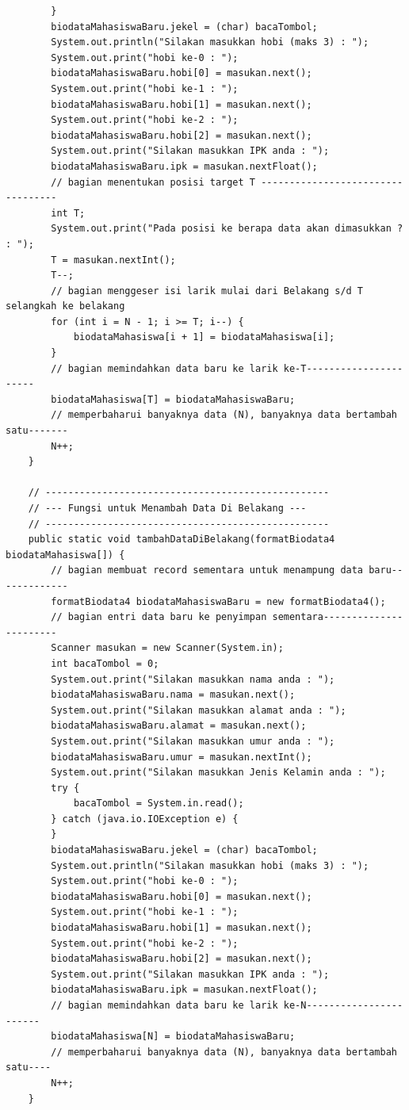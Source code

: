 \documentclass[a4paper,12pt]{article}
\begin{document}
\begin{lstlisting}
        }
        biodataMahasiswaBaru.jekel = (char) bacaTombol;
        System.out.println("Silakan masukkan hobi (maks 3) : ");
        System.out.print("hobi ke-0 : ");
        biodataMahasiswaBaru.hobi[0] = masukan.next();
        System.out.print("hobi ke-1 : ");
        biodataMahasiswaBaru.hobi[1] = masukan.next();
        System.out.print("hobi ke-2 : ");
        biodataMahasiswaBaru.hobi[2] = masukan.next();
        System.out.print("Silakan masukkan IPK anda : ");
        biodataMahasiswaBaru.ipk = masukan.nextFloat();
        // bagian menentukan posisi target T ----------------------------------
        int T;
        System.out.print("Pada posisi ke berapa data akan dimasukkan ? : ");
        T = masukan.nextInt();
        T--;
        // bagian menggeser isi larik mulai dari Belakang s/d T selangkah ke belakang
        for (int i = N - 1; i >= T; i--) {
            biodataMahasiswa[i + 1] = biodataMahasiswa[i];
        }
        // bagian memindahkan data baru ke larik ke-T----------------------
        biodataMahasiswa[T] = biodataMahasiswaBaru;
        // memperbaharui banyaknya data (N), banyaknya data bertambah satu-------
        N++;
    }

    // --------------------------------------------------
    // --- Fungsi untuk Menambah Data Di Belakang ---
    // --------------------------------------------------
    public static void tambahDataDiBelakang(formatBiodata4 biodataMahasiswa[]) {
        // bagian membuat record sementara untuk menampung data baru-------------
        formatBiodata4 biodataMahasiswaBaru = new formatBiodata4();
        // bagian entri data baru ke penyimpan sementara-----------------------
        Scanner masukan = new Scanner(System.in);
        int bacaTombol = 0;
        System.out.print("Silakan masukkan nama anda : ");
        biodataMahasiswaBaru.nama = masukan.next();
        System.out.print("Silakan masukkan alamat anda : ");
        biodataMahasiswaBaru.alamat = masukan.next();
        System.out.print("Silakan masukkan umur anda : ");
        biodataMahasiswaBaru.umur = masukan.nextInt();
        System.out.print("Silakan masukkan Jenis Kelamin anda : ");
        try {
            bacaTombol = System.in.read();
        } catch (java.io.IOException e) {
        }
        biodataMahasiswaBaru.jekel = (char) bacaTombol;
        System.out.println("Silakan masukkan hobi (maks 3) : ");
        System.out.print("hobi ke-0 : ");
        biodataMahasiswaBaru.hobi[0] = masukan.next();
        System.out.print("hobi ke-1 : ");
        biodataMahasiswaBaru.hobi[1] = masukan.next();
        System.out.print("hobi ke-2 : ");
        biodataMahasiswaBaru.hobi[2] = masukan.next();
        System.out.print("Silakan masukkan IPK anda : ");
        biodataMahasiswaBaru.ipk = masukan.nextFloat();
        // bagian memindahkan data baru ke larik ke-N-----------------------
        biodataMahasiswa[N] = biodataMahasiswaBaru;
        // memperbaharui banyaknya data (N), banyaknya data bertambah satu----
        N++;
    }


\end{lstlisting}
\end{document}

